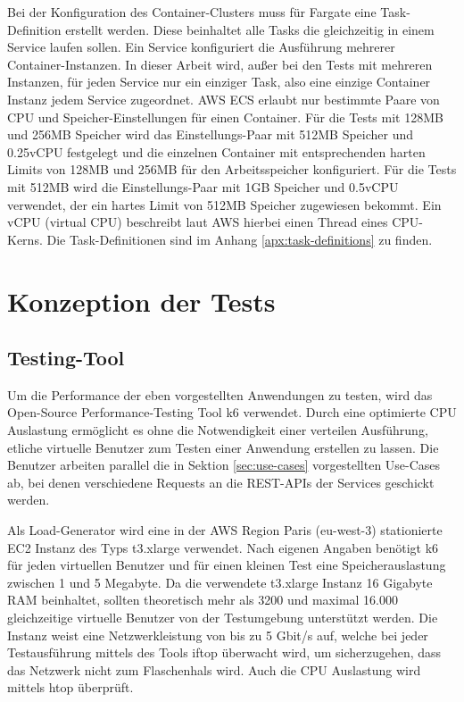Bei der Konfiguration des Container-Clusters muss für Fargate eine Task-Definition erstellt werden. Diese beinhaltet alle Tasks die gleichzeitig in einem Service laufen sollen. Ein Service konfiguriert die Ausführung mehrerer Container-Instanzen. In dieser Arbeit wird, außer bei den Tests mit mehreren Instanzen, für jeden Service nur ein einziger Task, also eine einzige Container Instanz jedem Service zugeordnet. AWS ECS erlaubt nur bestimmte Paare von CPU und Speicher-Einstellungen für einen Container. Für die Tests mit 128MB und 256MB Speicher wird das Einstellungs-Paar mit 512MB Speicher und 0.25vCPU festgelegt und die einzelnen Container mit entsprechenden harten Limits von 128MB und 256MB für den Arbeitsspeicher konfiguriert. Für die Tests mit 512MB wird die Einstellungs-Paar mit 1GB Speicher und 0.5vCPU verwendet, der ein hartes Limit von 512MB Speicher zugewiesen bekommt. Ein vCPU (virtual CPU) beschreibt laut AWS hierbei einen Thread eines CPU-Kerns\cite{noauthor_cpu-optionen_nodate}. Die Task-Definitionen sind im Anhang \ref{apx:task-definitions} zu finden.

\section{Konzeption der Tests}

\subsection{Testing-Tool}
Um die Performance der eben vorgestellten Anwendungen zu testen, wird das Open-Source Performance-Testing Tool k6 \cite{noauthor_load_nodate} verwendet. Durch eine optimierte CPU Auslastung ermöglicht es ohne die Notwendigkeit einer verteilen Ausführung, etliche virtuelle Benutzer zum Testen einer Anwendung erstellen zu lassen\cite{noauthor_running_nodate}. Die Benutzer arbeiten parallel die in Sektion \ref{sec:use-cases} vorgestellten Use-Cases ab, bei denen verschiedene Requests an die REST-APIs der Services geschickt werden. 

Als Load-Generator wird eine in der AWS Region Paris (eu-west-3) stationierte EC2 Instanz des Typs t3.xlarge verwendet.
Nach eigenen Angaben benötigt k6 für jeden virtuellen Benutzer und für einen kleinen Test eine Speicherauslastung zwischen 1 und 5 Megabyte\cite{noauthor_running_nodate}. Da die verwendete t3.xlarge Instanz 16 Gigabyte RAM beinhaltet, sollten theoretisch mehr als 3200 und maximal 16.000 gleichzeitige virtuelle Benutzer von der Testumgebung unterstützt werden. Die Instanz weist eine Netzwerkleistung von bis zu 5 Gbit/s auf, welche bei jeder Testausführung mittels des Tools iftop überwacht wird, um sicherzugehen, dass das Netzwerk nicht zum Flaschenhals wird. Auch die CPU Auslastung wird mittels htop überprüft.

